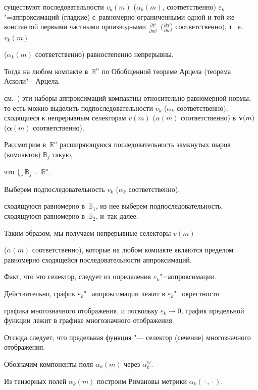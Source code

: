 существуют последовательности $v_k(m)$ ($\alpha_k(m)$, соответственно) $\varepsilon_k$"=аппроксимаций (гладкие) с~равномерно ограниченными одной и той же константой первыми частными производными $\frac{\partial v^i}{\partial m^j}$ $\bigl({\frac {\partial

\alpha^{ij}}{\partial m^l}}$ соответственно$\bigr)$, т.~е. $v_k(m)$

($\alpha_k(m)$ соответственно) равностепенно непрерывны. 

Тогда на любом компакте в~$\mathbb{R}^n$ по Обобщенной теореме Арцела (теорема Асколи"--~Арцела,

см.~\cite{popovkoval:bib:Yo}) эти наборы аппроксимаций компактны относительно равномерной нормы, то есть можно выделить подпоследовательности  $v_k$  ($\alpha_k$ соответственно), сходящиеся к непрерывным селекторам $v(m)$ ($\alpha(m)$ соответственно) в ${\bf v}(m)$ (${\boldsymbol \alpha}(m)$ соответственно). 

Рассмотрим в~$\mathbb{R}^n$ расширяющуюся последовательность замкнутых шаров (компактов) $\mathbb{B}_j$ такую,

что $\bigcup\mathbb{B}_j=\mathbb{R}^n$. 

Выберем подпоследовательность $v_k$  ($\alpha_k$ соответственно),

сходящуюся равномерно в~$\mathbb{B}_1$, из нее выберем подпоследовательность, сходящуюся равномерно в~$\mathbb{B}_2$, и~так далее. 

Таким образом, мы получаем непрерывные селекторы $v(m)$

($\alpha(m)$ соответственно), которые на любом компакте являются пределом равномерно сходящейся последовательности аппроксимаций.



Факт, что это селектор, следует из определения $\varepsilon_k$"=аппроксимации. 

Действительно, график $\varepsilon_k$"=аппроксимации лежит в $\varepsilon_k$"=окрестности

графика многозначного отображения, и поскольку $\varepsilon_k\to 0$, график предельной функции лежит в графике многозначного отображения. 

Отсюда следует, что предельная функция "--- селектор (сечение) многозначного отображения.



Обозначим компоненты поля $\alpha_k(m)$ через $\alpha^{ij}_k$. 

Из  тензорных  полей  $\alpha_k(m)$  построим  Римановы  метрики  $\alpha_k({}\cdot{}, {}\cdot{})$.



